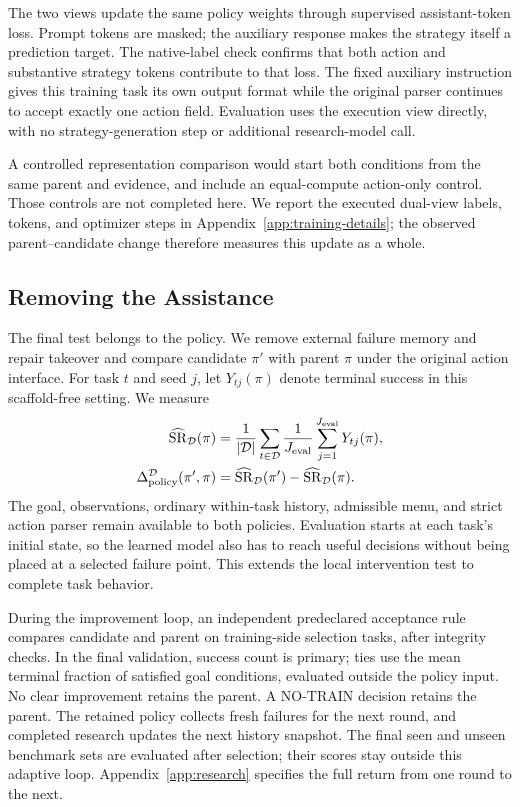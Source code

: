 The two views update the same policy weights through supervised
assistant-token loss. Prompt tokens are masked; the auxiliary response
makes the strategy itself a prediction target. The native-label check
confirms that both action and substantive strategy tokens contribute to
that loss. The fixed auxiliary instruction gives this training task its
own output format while the original parser continues to accept exactly
one action field. Evaluation uses the execution view directly, with no
strategy-generation step or additional research-model call.

A controlled representation comparison would start both conditions from
the same parent and evidence, and include an equal-compute action-only
control. Those controls are not completed here. We report the executed
dual-view labels, tokens, and optimizer steps in
Appendix~\ref{app:training-details}; the observed parent--candidate change
therefore measures this update as a whole.

\subsection{Removing the Assistance}
\label{sec:iteration}
The final test belongs to the policy. We remove external failure memory and
repair takeover and compare candidate $\pi'$ with parent $\pi$ under the
original action interface. For task $t$ and seed $j$, let $Y_{tj}(\pi)$ denote
terminal success in this scaffold-free setting. We measure
\begin{equation}
\begin{aligned}
\widehat{\operatorname{SR}}_{\mathcal D}(\pi)
&=\frac{1}{|\mathcal D|}\sum_{t\in\mathcal D}
\frac{1}{J_{\mathrm{eval}}}\sum_{j=1}^{J_{\mathrm{eval}}}Y_{tj}(\pi),\\
\Delta^{\mathcal D}_{\mathrm{policy}}(\pi',\pi)
&=\widehat{\operatorname{SR}}_{\mathcal D}(\pi')-\widehat{\operatorname{SR}}_{\mathcal D}(\pi).
\end{aligned}
\label{eq:policy-eval}
\end{equation}
The goal, observations, ordinary within-task history, admissible menu, and
strict action parser remain available to both policies. Evaluation starts
at each task's initial state, so the learned model also has to reach useful
decisions without being placed at a selected failure point. This extends
the local intervention test to complete task behavior.

During the improvement loop, an independent predeclared acceptance rule
compares candidate and parent on training-side selection tasks, after
integrity checks. In the final validation, success count is primary; ties
use the mean terminal fraction of satisfied goal conditions, evaluated
outside the policy input. No clear improvement retains the parent. A NO-TRAIN decision retains the
parent. The retained policy collects fresh failures for the next round, and
completed research updates the next history snapshot. The final seen and
unseen benchmark sets are evaluated after selection; their scores stay
outside this adaptive loop. Appendix~\ref{app:research} specifies the full
return from one round to the next.
